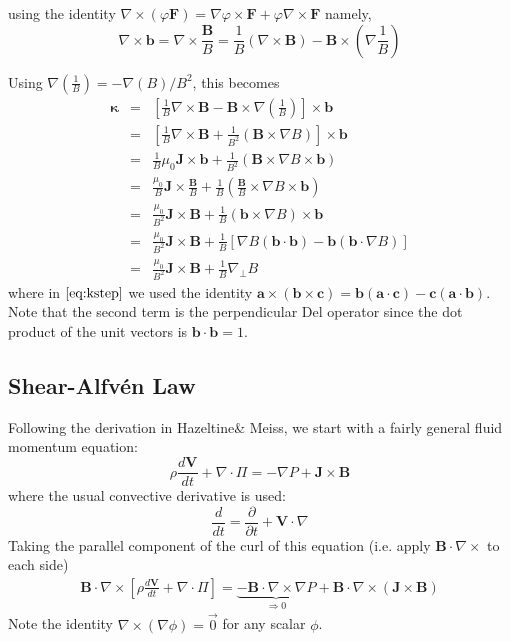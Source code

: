 \documentclass[12pt, a4paper]{article}
\newcommand{\deriv}[2]{\ensuremath{\frac{\partial #1}{\partial #2}}}
\newcommand{\Vec}[1]{\ensuremath{\mathbf{#1}}}
\newcommand{\Bvec}{\Vec{B}}
\newcommand{\Jvec}{\Vec{J}}
\newcommand{\Div}[1]{\ensuremath{\nabla\cdot #1 }}
\newcommand{\Curl}[1]{\ensuremath{\nabla\times #1 }}
\begin{document}
using the identity $\nabla \times ( \varphi \mathbf{F}) = \nabla \varphi \times \mathbf{F} + \varphi \nabla \times \mathbf{F} $  namely,
\[
\nabla\times\Vec{b}=\nabla\times\frac{\Vec{B}}{B}=\frac{1}{B}\left(\nabla\times\Vec{B}\right)-\Vec{B}\times\left(\nabla\frac{1}{B}\right)
\]

Using $\nabla\left(\frac{1}{B}\right) = -\nabla\left(B\right) / B^2$, this becomes
\begin{eqnarray}
\Vec{\kappa} &=& \left[\frac{1}{B}\Curl{\Bvec} - \Bvec\times\nabla\left(\frac{1}{B}\right)\right]\times\Vec{b}\nonumber\\
&=& \left[\frac{1}{B}\Curl{\Bvec} + \frac{1}{B^2}\left(\Bvec\times\nabla{B}\right)\right]\times\Vec{b}\nonumber\\
&=& \frac{1}{B}\mu_0{\Jvec}\times\Vec{b} + \frac{1}{B^2}\left(\Vec{B}\times\nabla{B}\times\Vec{b}\right)\nonumber\\
&=& \frac{\mu_0}{B}{\Jvec}\times\frac{\Vec{B}}{B} + \frac{1}{B}\left(\frac{\Bvec}{B}\times\nabla{B}\times\Vec{b}\right)\nonumber\\
&=& \frac{\mu_0}{B^2}\Jvec\times\Bvec + \frac{1}{B}\left(\Vec{b}\times\nabla B\right)\times\Vec{b} \nonumber \\
&=& \frac{\mu_0}{B^2}\Jvec\times\Bvec + \frac{1}{B}\left[\nabla B\left(\Vec{b}\cdot\Vec{b}\right)-\Vec{b}\left(\Vec{b}\cdot\nabla B\right)\right]\label{eq:kstep}\\
&=& \frac{\mu_0}{B^2}\Jvec\times\Bvec + \frac{1}{B}\nabla_\perp B \label{eq:kappajxb}
\end{eqnarray}
where in $\ref{eq:kstep}$ we used the identity $\mathbf{a} \times (\mathbf{b} \times \mathbf{c}) = \mathbf{b}(\mathbf{a} \cdot \mathbf{c}) - \mathbf{c}(\mathbf{a} \cdot \mathbf{b})$. Note that the second term is the perpendicular Del operator since the dot product of the unit vectors is $\Vec{b}\cdot\Vec{b}=1$.

\subsection{Shear-Alfv\'en Law}

Following the derivation in Hazeltine\& Meiss, we start with a fairly general fluid momentum equation:
\begin{equation}
\rho\frac{d\Vec{V}}{dt} + \Div{\Pi} = -\nabla P + \Jvec\times\Bvec
\label{eq:genfluid}
\end{equation}
where the usual convective derivative is used:
\[
\frac{d}{dt} = \deriv{}{t} + \Vec{V}\cdot\nabla
\]
Taking the parallel component of the curl of this equation (i.e. apply $\Bvec\cdot\nabla\times$ to each side)
\begin{eqnarray}
\Bvec\cdot\nabla\times\left[\rho\frac{d\Vec{V}}{dt} + \Div{\Pi}\right] = \underbrace{-\Bvec\cdot\nabla\times\nabla P}_{\Rightarrow 0} + \Bvec\cdot\nabla\times\left(\Jvec\times\Bvec\right)
\label{eq:mhd}
\end{eqnarray}
Note the identity $\nabla \times ( \nabla \phi )  = \vec{0}$ for any scalar $\phi$.
\end{document}
